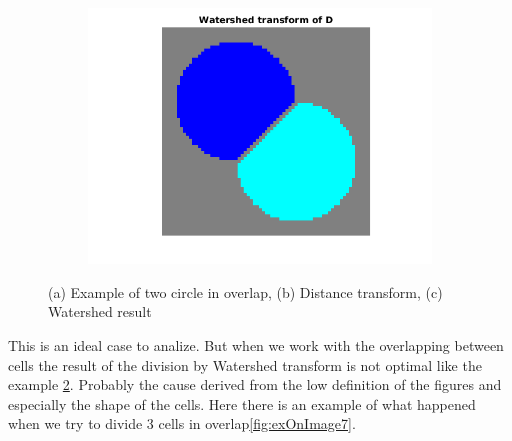 \begin{figure}[htbp]
\begin{subfigure}[b]{0.3\textwidth}
        \includegraphics[width=\textwidth]{img/watershedEx.png}
        \caption{ }
        \label{fig:overlapwater}
    \end{subfigure}
    \caption{(a) Example of two circle in overlap, (b) Distance transform, (c) Watershed result}\label{fig:stepswater}
\end{figure}
This is an ideal case to analize. But when we work with the overlapping between cells the result of the division by Watershed transform is not optimal like the example \ref{fig:stepswater}. Probably the cause derived from the low definition of the figures and especially the shape of the cells. Here there is an example of what happened when we try to divide 3 cells in overlap\ref{fig:exOnImage7}.
